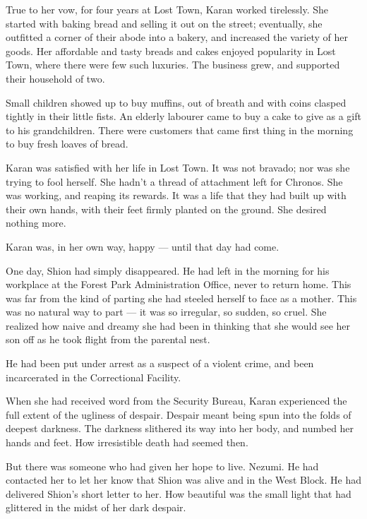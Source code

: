 True to her vow, for four years at Lost Town, Karan worked tirelessly.
She started with baking bread and selling it out on the street;
eventually, she outfitted a corner of their abode into a bakery, and
increased the variety of her goods. Her affordable and tasty breads and
cakes enjoyed popularity in Lost Town, where there were few such
luxuries. The business grew, and supported their household of two.

Small children showed up to buy muffins, out of breath and with coins
clasped tightly in their little fists. An elderly labourer came to buy a
cake to give as a gift to his grandchildren. There were customers that
came first thing in the morning to buy fresh loaves of bread.

Karan was satisfied with her life in Lost Town. It was not bravado; nor
was she trying to fool herself. She hadn't a thread of attachment left
for Chronos. She was working, and reaping its rewards. It was a life
that they had built up with their own hands, with their feet firmly
planted on the ground. She desired nothing more.

Karan was, in her own way, happy --- until that day had come.

One day, Shion had simply disappeared. He had left in the morning for
his workplace at the Forest Park Administration Office, never to return
home. This was far from the kind of parting she had steeled herself to
face as a mother. This was no natural way to part --- it was so irregular,
so sudden, so cruel. She realized how naive and dreamy she had been in
thinking that she would see her son off as he took flight from the
parental nest.

He had been put under arrest as a suspect of a violent crime, and been
incarcerated in the Correctional Facility.

When she had received word from the Security Bureau, Karan experienced
the full extent of the ugliness of despair. Despair meant being spun
into the folds of deepest darkness. The darkness slithered its way into
her body, and numbed her hands and feet. How irresistible death had
seemed then.

But there was someone who had given her hope to live. Nezumi. He had
contacted her to let her know that Shion was alive and in the West
Block. He had delivered Shion's short letter to her. How beautiful was
the small light that had glittered in the midst of her dark despair.


